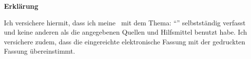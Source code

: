 

\newpage
\begin{framed}
\begin{center}
\Large\bfseries Erklärung
\end{center}
\medskip
\noindent
Ich versichere hiermit, dass ich meine \Was \ mit dem Thema:
\enquote{\Titel}
selbstständig verfasst und keine anderen als die angegebenen Quellen und Hilfsmittel benutzt habe. Ich versichere zudem, dass die eingereichte elektronische Fassung mit der gedruckten Fassung übereinstimmt. \\
\vspace{3cm} \\
\end{framed}

\endinput
